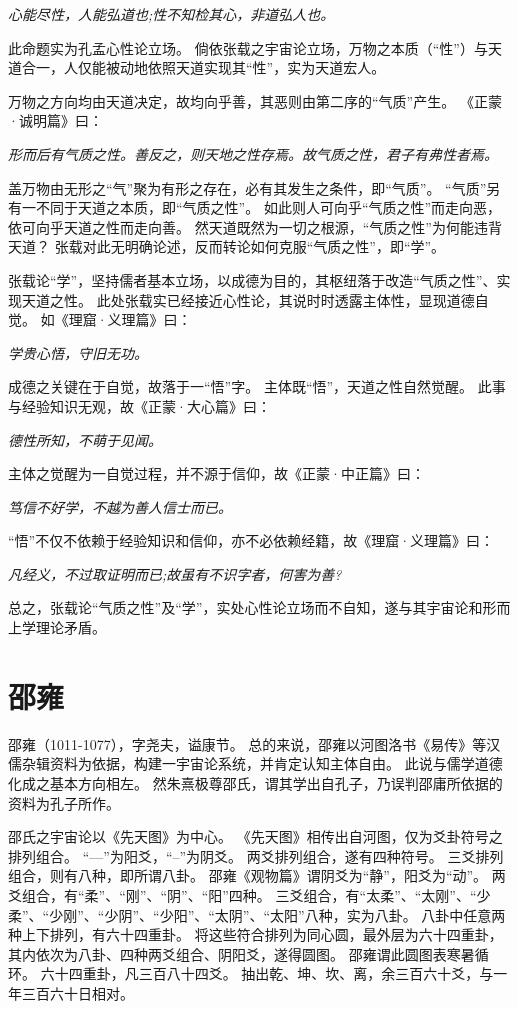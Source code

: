 \documentclass[11pt]{article}
\begin{document}
\textit{心能尽性，人能弘道也;性不知检其心，非道弘人也。}

此命题实为孔孟心性论立场。
倘依张载之宇宙论立场，万物之本质（“性”）与天道合一，人仅能被动地依照天道实现其“性”，实为天道宏人。

\par

万物之方向均由天道决定，故均向乎善，其恶则由第二序的“气质”产生。
《正蒙·诚明篇》曰：

\textit{形而后有气质之性。善反之，则天地之性存焉。故气质之性，君子有弗性者焉。}

盖万物由无形之“气”聚为有形之存在，必有其发生之条件，即“气质”。
“气质”另有一不同于天道之本质，即“气质之性”。
如此则人可向乎“气质之性”而走向恶，依可向乎天道之性而走向善。
然天道既然为一切之根源，“气质之性”为何能违背天道？
张载对此无明确论述，反而转论如何克服“气质之性”，即“学”。

\par

张载论“学”，坚持儒者基本立场，以成德为目的，其枢纽落于改造“气质之性”、实现天道之性。
此处张载实已经接近心性论，其说时时透露主体性，显现道德自觉。
如《理窟·义理篇》曰：

\textit{学贵心悟，守旧无功。}

成德之关键在于自觉，故落于一“悟”字。
主体既“悟”，天道之性自然觉醒。
此事与经验知识无观，故《正蒙·大心篇》曰：

\textit{德性所知，不萌于见闻。}

主体之觉醒为一自觉过程，并不源于信仰，故《正蒙·中正篇》曰：

\textit{笃信不好学，不越为善人信士而已。}

“悟”不仅不依赖于经验知识和信仰，亦不必依赖经籍，故《理窟·义理篇》曰：

\textit{凡经义，不过取证明而已;故虽有不识字者，何害为善?}

总之，张载论“气质之性”及“学”，实处心性论立场而不自知，遂与其宇宙论和形而上学理论矛盾。

\section{邵雍}
邵雍（1011-1077），字尧夫，谥康节。
总的来说，邵雍以河图洛书《易传》等汉儒杂辑资料为依据，构建一宇宙论系统，并肯定认知主体自由。
此说与儒学道德化成之基本方向相左。
然朱熹极尊邵氏，谓其学出自孔子，乃误判邵庸所依据的资料为孔子所作。

\par

邵氏之宇宙论以《先天图》为中心。
《先天图》相传出自河图，仅为爻卦符号之排列组合。
“—”为阳爻，“--”为阴爻。
两爻排列组合，遂有四种符号。
三爻排列组合，则有八种，即所谓八卦。
邵雍《观物篇》谓阴爻为“静”，阳爻为“动”。
两爻组合，有“柔”、“刚”、“阴”、“阳”四种。
三爻组合，有“太柔”、“太刚”、“少柔”、“少刚”、“少阴”、“少阳”、“太阴”、“太阳”八种，实为八卦。
八卦中任意两种上下排列，有六十四重卦。
将这些符合排列为同心圆，最外层为六十四重卦，其内依次为八卦、四种两爻组合、阴阳爻，遂得圆图。
邵雍谓此圆图表寒暑循环。
六十四重卦，凡三百八十四爻。
抽出乾、坤、坎、离，余三百六十爻，与一年三百六十日相对。
\end{document}
